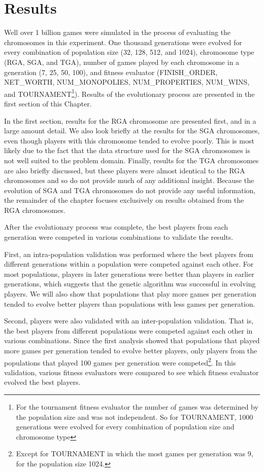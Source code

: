 \clearpage
\chapter{Results}\label{chap:results}

Well over 1 billion games were simulated in the process of evaluating the
chromosomes in this experiment. One thousand generations were evolved for every
combination of population size (32, 128, 512, and 1024), chromosome type (RGA,
SGA, and TGA), number of games played by each chromosome in a generation (7, 25,
50, 100), and fitness evaluator (FINISH\_ORDER, NET\_WORTH, NUM\_MONOPOLIES,
NUM\_PROPERTIES, NUM\_WINS, and TOURNAMENT\footnote{For the tournament fitness
evaluator the number of games was determined by the population size and was not
independent. So for TOURNAMENT, 1000 generations were evolved for every
combination of population size and chromosome type}). Results of the
evolutionary process are presented in the first section of this Chapter.

In the first section, results for the RGA chromosome are presented first, and in
a large amount detail. We also look briefly at the results for the SGA
chromosomes, even though players with this chromosome tended to evolve poorly.
This is most likely due to the fact that the data structure used for the SGA
chromosomes is not well suited to the problem domain. Finally, results for the
TGA chromosomes are also briefly discussed, but these players were almost
identical to the RGA chromosomes and so do not provide much of any additional
insight. Because the evolution of SGA and TGA chromosomes do not provide any
useful information, the remainder of the chapter focuses exclusively on results
obtained from the RGA chromosomes.

After the evolutionary process was complete, the best players from each
generation were competed in various combinations to validate the results. 

First, an intra-population validation was performed where the best players from
different generations within a population were competed against each other. For
most populations, players in later generations were better than players in
earlier generations, which suggests that the genetic algorithm was successful in
evolving players. We will also show that populations that play more games per
generation tended to evolve better players than populations with less games per
generation. 

Second, players were also validated with an inter-population validation. That
is, the best players from different populations were competed against each other
in various combinations. Since the first analysis showed that populations that
played more games per generation tended to evolve better players, only players
from the populations that played 100 games per generation were
competed\footnote{Except for TOURNAMENT in which the most games per generation
was 9, for the population size 1024.}. In this validation, various fitness
evaluators were compared to see which fitness evaluator evolved the best
players.

